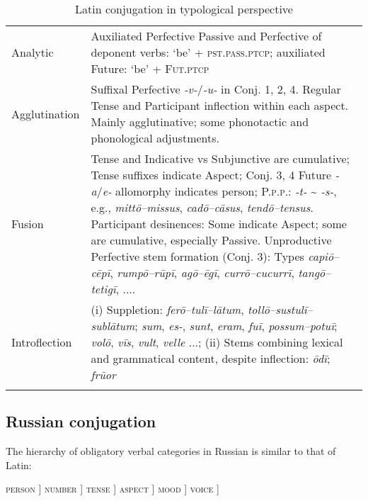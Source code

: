 \documentclass[output=paper, colorlinks,citecolor=brown]{langsci/langscibook}
\begin{document}
\begin{table}
\caption{Latin conjugation in typological perspective\label{tab:andersen_15}}
\begin{tabularx}{\textwidth}{lQ}
\lsptoprule
Analytic & Auxiliated Perfective Passive and Perfective of deponent verbs: ‘be' + \textsc{pst.pass.ptcp}; auxiliated Future: ‘be' + \textsc{Fut.ptcp} \\
Agglutination & Suffixal Perfective \textit{-v-}/\textit{-u-} in Conj. 1, 2, 4. 
Regular Tense and Participant inflection within each aspect. Mainly agglutinative; some phonotactic and phonological adjustments. \\
Fusion & Tense and Indicative vs Subjunctive are cumulative; Tense suffixes indicate Aspect; \newline
        Conj. 3, 4 Future \textit{-a}/\textit{e-} allomorphy indicates person; \newline
        \textsc{P.p.p}.: \textit{-t-} {\textasciitilde} \textit{-s-}, e.g., \textit{mittō–missus}, \textit{cadō–cāsus}, \textit{tendō–tensus}.\newline
        Participant desinences: Some indicate Aspect; some are cumulative, especially Passive. Unproductive Perfective stem formation (Conj. 3): Types \textit{capiō–cēpī}, \textit{rumpō–rūpī}, \textit{agō–ēgī}, \textit{currō–cucurrī}, \textit{tangō–tetigī}, ....\\
Introflection & (i) Suppletion: \textit{ferō–tulī–lātum}, \textit{tollō–sustulī–sublātum}; \textit{sum}, \textit{es-}, \textit{sunt}, \textit{eram}, \textit{fuī}, \textit{possum–potuī}; \textit{volō}, \textit{vīs}, \textit{vult}, \textit{velle} ...; (ii) Stems combining lexical and grammatical content, despite inflection: \textit{ōdī}; \textit{frūor}\\
\lspbottomrule
\end{tabularx}
\end{table}

\subsection{Russian conjugation}  \label{russian_conjugation}

The hierarchy of obligatory verbal categories in Russian  \citep{Jakobson1956b} is similar to that of Latin:

\ea
    \label{ex:andersen_8}
          \textsc{person} ] \textsc{number} ] \textsc{tense} ] \textsc{aspect} ] \textsc{mood} ] \textsc{voice} ]   
\z
\end{document}
